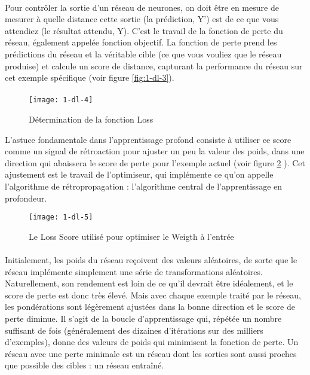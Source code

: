 \paragraph{}
\paragraph{}

Pour contrôler la sortie d'un réseau de neurones, on doit  être en mesure de mesurer à quelle distance cette sortie (la prédiction, Y’) \cite{dlp}  est de ce que vous attendiez (le résultat attendu, Y). C'est le travail de la fonction de perte du réseau, également appelée fonction objectif. La fonction de perte prend les prédictions du réseau et la véritable cible (ce que vous vouliez que le réseau produise) et calcule un score de distance, capturant la performance du réseau sur cet exemple spécifique (voir figure \ref{fig:1-dl-3}).
\paragraph{}

\begin{figure}[h]
    \centering
    \texttt{[image: 1-dl-4]}
    \caption{Détermination de la fonction Loss}
    \label{fig:1-dl-4}
\end{figure}

L'astuce fondamentale dans l'apprentissage  profond consiste à utiliser ce score comme un signal de rétroaction pour ajuster un peu la valeur des poids, dans une direction qui abaissera le score de perte pour l'exemple actuel (voir figure \ref{fig:1-dl-5} ). Cet ajustement est le travail de l'optimiseur, qui implémente ce qu'on appelle l'algorithme de rétropropagation : l'algorithme central de l'apprentissage en profondeur. 
\begin{figure}[h]
    \centering
    \texttt{[image: 1-dl-5]}
    \caption{Le Loss Score utilisé pour optimiser le Weigth à  l'entrée}
    \label{fig:1-dl-5}
\end{figure}
\paragraph{}Initialement, les poids du réseau reçoivent des valeurs aléatoires, de sorte que le réseau implémente simplement une série de transformations aléatoires. Naturellement, son rendement est loin de ce qu'il devrait être idéalement, et le score de perte est donc très élevé. Mais avec chaque exemple traité par le réseau, les pondérations sont légèrement ajustées dans la bonne direction et le score de perte diminue. Il s'agit de la boucle d'apprentissage qui, répétée un nombre suffisant de fois (généralement des dizaines d'itérations sur des milliers d'exemples), donne des valeurs de poids qui minimisent la fonction de perte. Un réseau avec une perte minimale est un réseau dont les sorties sont aussi proches que possible des cibles : un réseau entraîné. 
